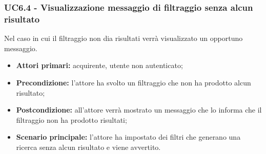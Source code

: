 \subsubsection{UC6.4 - Visualizzazione messaggio di filtraggio senza alcun risultato} \label{UC6.4}
Nel caso in cui il filtraggio non dia risultati verrà visualizzato un opportuno messaggio.
\begin{itemize}
	\item \textbf{Attori primari:} acquirente, utente non autenticato;
	\item \textbf{Precondizione:} l'attore ha svolto un filtraggio che non ha prodotto alcun risultato;
	\item \textbf{Postcondizione:} all'attore verrà mostrato un messaggio che lo informa che il filtraggio non ha prodotto risultati;
	\item \textbf{Scenario principale:} l'attore ha impostato dei filtri che generano una ricerca senza alcun risultato e viene avvertito.
\end{itemize}
